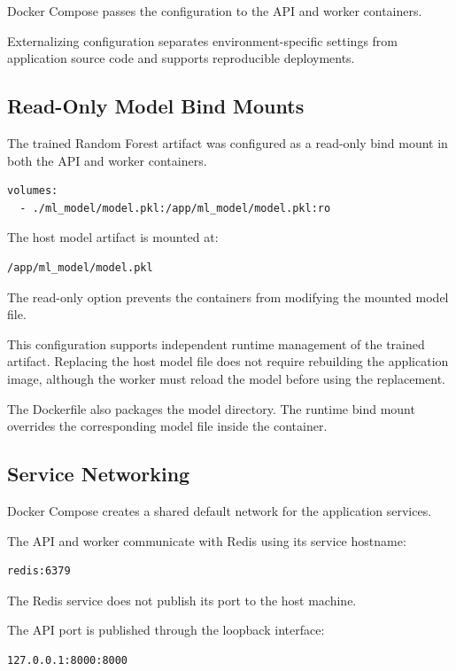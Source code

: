 \documentclass[11pt,a4paper]{article}
\begin{document}
Docker Compose passes the configuration to the API
and worker containers.

Externalizing configuration separates environment-specific
settings from application source code and supports
reproducible deployments.

\subsection{Read-Only Model Bind Mounts}

The trained Random Forest artifact was configured as a
read-only bind mount in both the API and worker
containers.

\begin{lstlisting}
volumes:
  - ./ml_model/model.pkl:/app/ml_model/model.pkl:ro
\end{lstlisting}

The host model artifact is mounted at:

\begin{lstlisting}
/app/ml_model/model.pkl
\end{lstlisting}

The read-only option prevents the containers from
modifying the mounted model file.

This configuration supports independent runtime
management of the trained artifact. Replacing the
host model file does not require rebuilding the
application image, although the worker must reload
the model before using the replacement.

The Dockerfile also packages the model directory.
The runtime bind mount overrides the corresponding
model file inside the container.

\subsection{Service Networking}

Docker Compose creates a shared default network for
the application services.

The API and worker communicate with Redis using its
service hostname:

\begin{lstlisting}
redis:6379
\end{lstlisting}

The Redis service does not publish its port to the
host machine.

The API port is published through the loopback
interface:

\begin{lstlisting}
127.0.0.1:8000:8000
\end{lstlisting}
\end{document}

